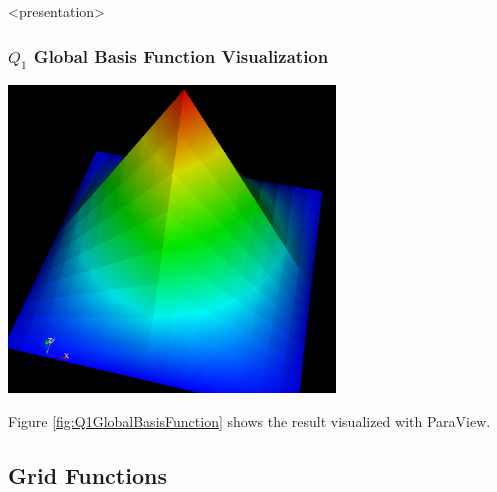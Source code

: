 \begin{frame}<presentation>
\frametitle<presentation>{$Q_1$ Global Basis Function Visualization}
\begin{center}
\includegraphics[width=0.65\textwidth]{./EPS/q1}
\end{center}
\end{frame}

Figure \ref{fig:Q1GlobalBasisFunction} shows the result visualized
with ParaView.


\subsection{Grid Functions}

